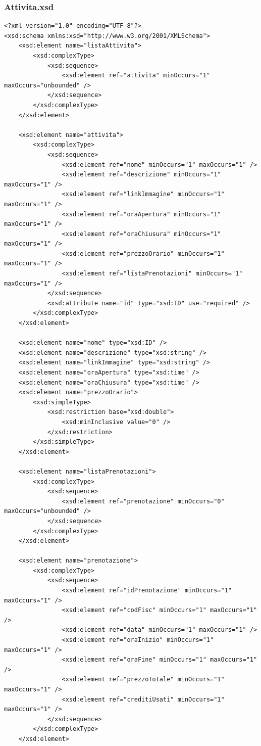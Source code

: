 \documentclass [a4paper, 12pt]{book}
\begin{document}
\subsubsection{Attivita.xsd}
\begin{lstlisting}[style=XML]
<?xml version="1.0" encoding="UTF-8"?>
<xsd:schema xmlns:xsd="http://www.w3.org/2001/XMLSchema">
    <xsd:element name="listaAttivita">
        <xsd:complexType>
            <xsd:sequence>
                <xsd:element ref="attivita" minOccurs="1" maxOccurs="unbounded" />
            </xsd:sequence>
        </xsd:complexType>
    </xsd:element>

    <xsd:element name="attivita">
        <xsd:complexType>
            <xsd:sequence>
                <xsd:element ref="nome" minOccurs="1" maxOccurs="1" />
                <xsd:element ref="descrizione" minOccurs="1" maxOccurs="1" />
                <xsd:element ref="linkImmagine" minOccurs="1" maxOccurs="1" />
                <xsd:element ref="oraApertura" minOccurs="1" maxOccurs="1" />
                <xsd:element ref="oraChiusura" minOccurs="1" maxOccurs="1" />
                <xsd:element ref="prezzoOrario" minOccurs="1" maxOccurs="1" />
                <xsd:element ref="listaPrenotazioni" minOccurs="1" maxOccurs="1" />
            </xsd:sequence>
            <xsd:attribute name="id" type="xsd:ID" use="required" />
        </xsd:complexType>
    </xsd:element>

    <xsd:element name="nome" type="xsd:ID" />
    <xsd:element name="descrizione" type="xsd:string" />
    <xsd:element name="linkImmagine" type="xsd:string" />
    <xsd:element name="oraApertura" type="xsd:time" />
    <xsd:element name="oraChiusura" type="xsd:time" />
    <xsd:element name="prezzoOrario">
        <xsd:simpleType>
            <xsd:restriction base="xsd:double">
                <xsd:minInclusive value="0" />
            </xsd:restriction>
        </xsd:simpleType>
    </xsd:element>

    <xsd:element name="listaPrenotazioni">
        <xsd:complexType>
            <xsd:sequence>
                <xsd:element ref="prenotazione" minOccurs="0" maxOccurs="unbounded" /> 
            </xsd:sequence>
        </xsd:complexType>
    </xsd:element>

    <xsd:element name="prenotazione">
        <xsd:complexType>
            <xsd:sequence>
                <xsd:element ref="idPrenotazione" minOccurs="1" maxOccurs="1" />
                <xsd:element ref="codFisc" minOccurs="1" maxOccurs="1" />
                <xsd:element ref="data" minOccurs="1" maxOccurs="1" />
                <xsd:element ref="oraInizio" minOccurs="1" maxOccurs="1" />
                <xsd:element ref="oraFine" minOccurs="1" maxOccurs="1" />
                <xsd:element ref="prezzoTotale" minOccurs="1" maxOccurs="1" />
                <xsd:element ref="creditiUsati" minOccurs="1" maxOccurs="1" />
            </xsd:sequence>
        </xsd:complexType>
    </xsd:element>


\end{lstlisting}
\end{document}
